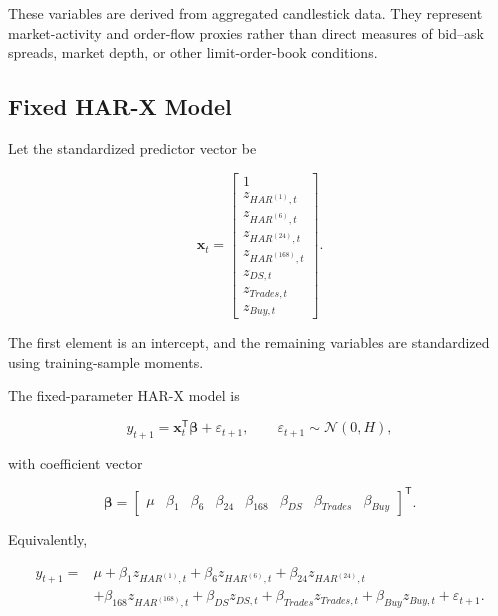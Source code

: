 These variables are derived from aggregated candlestick data.
They represent market-activity and order-flow proxies rather
than direct measures of bid--ask spreads, market depth, or
other limit-order-book conditions.

\subsection{Fixed HAR-X Model}

Let the standardized predictor vector be

\begin{equation}
\mathbf{x}_t
=
\begin{bmatrix}
1 \\
z_{HAR^{(1)},t} \\
z_{HAR^{(6)},t} \\
z_{HAR^{(24)},t} \\
z_{HAR^{(168)},t} \\
z_{DS,t} \\
z_{Trades,t} \\
z_{Buy,t}
\end{bmatrix}.
\label{eq:harx-design-vector}
\end{equation}

The first element is an intercept, and the remaining variables
are standardized using training-sample moments.

The fixed-parameter HAR-X model is

\begin{equation}
y_{t+1}
=
\mathbf{x}_t^{\mathsf{T}}
\boldsymbol{\beta}
+
\varepsilon_{t+1},
\qquad
\varepsilon_{t+1}
\sim
\mathcal{N}(0,H),
\label{eq:fixed-harx-vector}
\end{equation}

with coefficient vector

\[
\boldsymbol{\beta}
=
\begin{bmatrix}
\mu &
\beta_1 &
\beta_6 &
\beta_{24} &
\beta_{168} &
\beta_{DS} &
\beta_{Trades} &
\beta_{Buy}
\end{bmatrix}^{\mathsf{T}}.
\]

Equivalently,

\begin{align}
y_{t+1}
={}&
\mu
+
\beta_1 z_{HAR^{(1)},t}
+
\beta_6 z_{HAR^{(6)},t}
+
\beta_{24} z_{HAR^{(24)},t}
\nonumber\\
&+
\beta_{168} z_{HAR^{(168)},t}
+
\beta_{DS} z_{DS,t}
+
\beta_{Trades} z_{Trades,t}
+
\beta_{Buy} z_{Buy,t}
+
\varepsilon_{t+1}.
\label{eq:fixed-harx-expanded}
\end{align}

